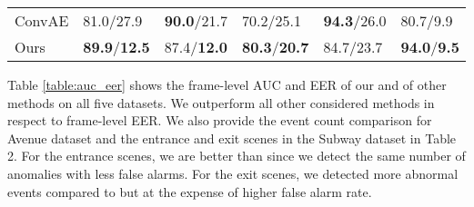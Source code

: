 \documentclass[a4paper]{article}
\begin{document}
\begin{table}[]
\begin{tabular}{M{2.3cm}M{1.8cm}M{1.8cm}M{1.8cm}M{1.8cm}M{1.8cm}}
			ConvAE \cite{hasan2016}                  & 81.0/27.9 & \textbf{90.0}/21.7 & 70.2/25.1 & \textbf{94.3}/26.0                                                  & 80.7/9.9                                               \\
			Ours                    & \textbf{89.9}/\textbf{12.5} & 87.4/\textbf{12.0} & \textbf{80.3}/\textbf{20.7} & 84.7/23.7                                                  & \textbf{94.0}/\textbf{9.5}                                               \\ \hline
		\end{tabular}\end{table}

Table \ref{table:auc_eer} shows the frame-level AUC and EER of our and of other methods on all five datasets. We outperform all other considered methods in respect to frame-level EER. We also provide the event count comparison for Avenue dataset and the entrance and exit scenes in the Subway dataset in Table 2. For the entrance scenes, we are better than \cite{hasan2016} since we detect the same number of anomalies with less false alarms. For the exit scenes, we detected more abnormal events compared to \cite{hasan2016} but at the expense of higher false alarm rate.
\end{document}
